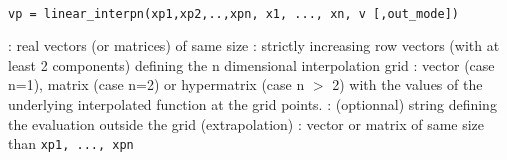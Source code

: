\begin{mandesc}
  \\ %
\end{mandesc}
\label{linear-interpn}
\begin{calling_sequence}
\begin{verbatim}
vp = linear_interpn(xp1,xp2,..,xpn, x1, ..., xn, v [,out_mode])
\end{verbatim}
\end{calling_sequence}
\begin{parameters}
  \begin{varlist}
     : real vectors (or matrices) of same size
     :  strictly increasing row vectors (with at least 2 components)
    defining the n dimensional interpolation grid
     :  vector (case n=1), matrix (case n=2) or hypermatrix (case n $>$ 2) with the
    values of the underlying interpolated function at the grid points.
    : (optionnal) string defining the evaluation outside the grid (extrapolation)
    :  vector or matrix of same size than \verb!xp1, ..., xpn!
  \end{varlist}
\end{parameters}
